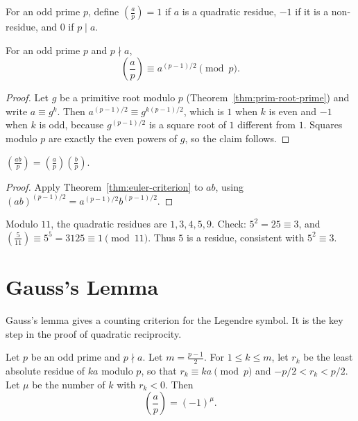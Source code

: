 \begin{definition}
For an odd prime $p$, define $\left(\frac{a}{p}\right)=1$ if $a$ is a quadratic residue, $-1$ if it is a non-residue, and $0$ if $p\mid a$.
\end{definition}

\begin{theorem}\label{thm:euler-criterion}
For an odd prime $p$ and $p\nmid a$,
\[
  \left(\frac{a}{p}\right)\equiv a^{(p-1)/2}\pmod p.
\]
\end{theorem}

\begin{proof}
Let $g$ be a primitive root modulo $p$ (Theorem~\ref{thm:prim-root-prime}) and write $a\equiv g^k$. Then $a^{(p-1)/2}\equiv g^{k(p-1)/2}$, which is $1$ when $k$ is even and $-1$ when $k$ is odd, because $g^{(p-1)/2}$ is a square root of $1$ different from $1$. Squares modulo $p$ are exactly the even powers of $g$, so the claim follows.
\end{proof}

\begin{proposition}\label{prop:legendre-mult}
$\left(\frac{ab}{p}\right)=\left(\frac{a}{p}\right)\left(\frac{b}{p}\right)$.
\end{proposition}

\begin{proof}
Apply Theorem~\ref{thm:euler-criterion} to $ab$, using $(ab)^{(p-1)/2}=a^{(p-1)/2}b^{(p-1)/2}$.
\end{proof}

\begin{example}
Modulo $11$, the quadratic residues are $1,3,4,5,9$. Check: $5^2=25\equiv 3$, and $\left(\frac{5}{11}\right)\equiv 5^{5}=3125\equiv 1\pmod{11}$. Thus $5$ is a residue, consistent with $5^2\equiv 3$.
\end{example}

\section{Gauss's Lemma}

Gauss's lemma gives a counting criterion for the Legendre symbol. It is the key step in the proof of quadratic reciprocity.

\begin{lemma}[Gauss]\label{lem:gauss}
Let $p$ be an odd prime and $p\nmid a$. Let $m=\frac{p-1}{2}$. For $1\le k\le m$, let $r_k$ be the least absolute residue of $ka$ modulo $p$, so that $r_k\equiv ka\pmod p$ and $-p/2<r_k<p/2$. Let $\mu$ be the number of $k$ with $r_k<0$. Then
\[
  \left(\frac{a}{p}\right)=(-1)^{\mu}.
\]
\end{lemma}

